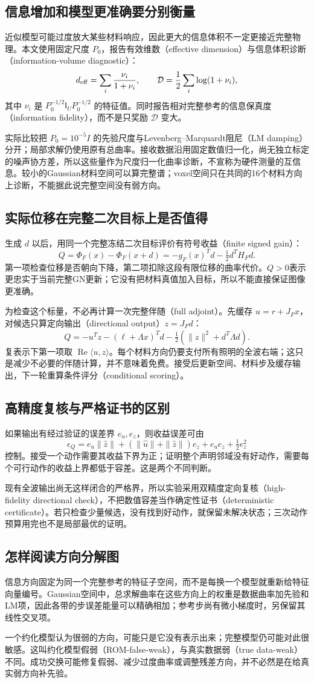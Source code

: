 \subsection{信息增加和模型更准确要分别衡量}
近似模型可能过度放大某些材料响应，因此更大的信息体积不一定更接近完整物理。本文使用固定尺度 $P_0$，报告有效维数（effective dimension）与信息体积诊断（information-volume diagnostic）：
\[
 d_{\rm eff}=\sum_i\frac{\nu_i}{1+\nu_i},\qquad
 \mathcal D=\frac12\sum_i\log(1+\nu_i),
\]
其中 $\nu_i$ 是 $P_0^{-1/2}\mathsf I_UP_0^{-1/2}$ 的特征值。同时报告相对完整参考的信息保真度（information fidelity），而不是只奖励 $\mathcal D$ 变大。

实际比较把 $P_0=10^{-5}I$ 的先验尺度与Levenberg--Marquardt阻尼（LM damping）分开；局部求解仍使用原有总曲率。接收数据沿用固定数值归一化，尚无独立标定的噪声协方差，所以这些量作为尺度归一化曲率诊断，不宣称为硬件测量的互信息。较小的Gaussian材料空间可以算完整谱；voxel空间只在共同的16个材料方向上诊断，不能据此说完整空间没有弱方向。

\subsection{实际位移在完整二次目标上是否值得}
生成 $d$ 以后，用同一个完整冻结二次目标评价有符号收益（finite signed gain）：
\[
 Q=\Phi_F(x)-\Phi_F(x+d)=-g_F(x)^Td-\tfrac12d^TH_Fd.
\]
第一项检查位移是否朝向下降，第二项扣除这段有限位移的曲率代价。$Q>0$表示更忠实于当前完整GN更新；它没有把材料真值加入目标，所以不能直接保证图像更准确。

为检查这个标量，不必再计算一次完整伴随（full adjoint）。先缓存 $u=r+J_Fx$，对候选只算定向输出（directional output）$z=J_Fd$：
\[
 Q=-u^Tz-(\ell+\Lambda x)^Td
     -\tfrac12(\|z\|^2+d^T\Lambda d).
\]
复表示下第一项取 $\operatorname{Re}\langle u,z\rangle$。每个材料方向仍要支付所有照明的全波右端；这只是减少不必要的伴随计算，并不意味着免费。接受后更新空间、材料步及缓存输出，下一轮重算条件评分（conditional scoring）。

\subsection{高精度复核与严格证书的区别}
如果输出有经过验证的误差界 $e_u,e_z$，则收益误差可由
\[
 \epsilon_Q=e_u\|\widehat z\|+(\|\widehat u\|+\|\widehat z\|)e_z+e_ue_z+\tfrac12e_z^2
\]
控制。接受一个动作需要其收益下界为正；证明整个声明邻域没有好动作，需要每个可行动作的收益上界都低于容差。这是两个不同判断。

现有全波输出尚无这样闭合的严格界，所以实验采用双精度定向复核（high-fidelity directional check），不把数值容差当作确定性证书（deterministic certificate）。若只检查少量候选，没有找到好动作，就保留未解决状态；三次动作预算用完也不是局部最优的证明。

\subsection{怎样阅读方向分解图}
信息方向固定为同一个完整参考的特征子空间，而不是每换一个模型就重新给特征向量编号。Gaussian空间中，总求解曲率在这些方向上的权重是数据曲率加先验和LM项，因此各带的步误差能量可以精确相加；参考步尚有微小梯度时，另保留其线性交叉项。

一个约化模型认为很弱的方向，可能只是它没有表示出来；完整模型仍可能对此很敏感。这叫约化模型假弱（ROM-false-weak），与真实数据弱（true data-weak）不同。成功交换可能修复假弱、减少过度曲率或调整残差方向，并不必然是在给真实弱方向补先验。
